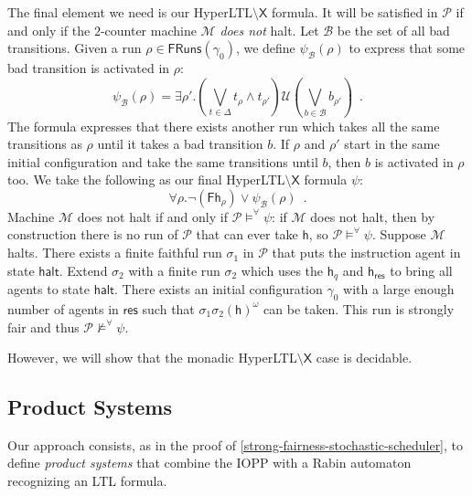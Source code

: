 \documentclass[10pt,a4paper]{article}
\newcommand{\fairrunsfrom}[1]{\mathsf{FRuns}(#1)}
\newcommand{\config}{\gamma}
\newcommand{\run}{\rho}
\newcommand{\transitions}{\Delta}
\newcommand{\PP}{\mathcal{P}}                  %
\newcommand{\ltlnext}{\mathsf{X}}
\newcommand{\ltlfinally}{\mathsf{F}}
\newcommand{\ltluntil}{\mathbin \mathcal{U}}
\newcommand{\modelsforall}{\models^{\forall}}
\newcommand{\machine}{\mathcal{M}}
\newcommand{\halt}{\mathsf{halt}}
\newcommand{\halttrans}{\mathsf{h}}
\newcommand{\res}{\mathsf{res}} %
\newcommand{\bad}{\mathcal{B}}
\begin{document}
\begin{appendixproof}
	The final element we need is our HyperLTL\(\setminus \ltlnext\) formula.
	It will be satisfied in \(\PP\) if and only if the \(2\)-counter machine \(\machine\) \emph{does not} halt.
	Let \(\bad\) be the set of all bad transitions.
	Given a run \(\run \in \fairrunsfrom{\config_0}\), we define \(\psi_{\bad}(\run)\) to express that some bad transition is activated in \(\run\): \[ \psi_{\bad}(\run)= \exists \run'.
		(\bigvee_{t\in \transitions} t_\run \land t_{\run'}) \ltluntil
		(\bigvee_{b\in \bad}  b_{\run'})\enspace .
	\]
	The formula expresses that there exists another run
	which takes all the same transitions as \(\run\) until it takes a bad transition \(b\).
	If \(\run\) and \(\run'\) start in the same initial configuration and take the same transitions until \(b\), then \(b\) is activated in \(\run\) too.
	We take the following as our final HyperLTL\(\setminus \ltlnext\) formula \(\psi\): \[ \forall \run.
		\neg( \ltlfinally \halttrans_\run) \lor
		\psi_{\bad}(\run)\enspace.
	\]
	Machine \(\machine\) does not halt if and only if \(\PP\modelsforall\psi\): if \(\machine\) does not halt, then by construction there is no run of \(\PP\) that can ever take \(\halttrans\), so \(\PP\modelsforall\psi\).
	Suppose \(\machine\) halts.
	There exists a finite faithful run \(\sigma_1\) in \(\PP\) that puts the instruction agent in state \(\halt\).
	Extend \(\sigma_2\) with a finite run \(\sigma_2\) which uses the \(\halttrans_q\) and \(\halttrans_{\res}\) to bring all agents to state \(\halt\).
	There exists an initial configuration \(\config_0\) with a large enough number of agents in \(\res\) such that \(\sigma_1 \sigma_2 (\halttrans)^\omega\) can be taken.
	This run is strongly fair and thus \(\PP\nvDash^{\forall}\psi\).
\end{appendixproof}

%
%

However, we will show that the monadic HyperLTL\(\setminus \ltlnext\) case is decidable.
%

%
\subsection{Product Systems}
%
Our approach consists, as in the proof of \cref{strong-fairness-stochastic-scheduler}, to define \emph{product systems} that combine the IOPP with a Rabin automaton recognizing an LTL formula.
\end{document}
